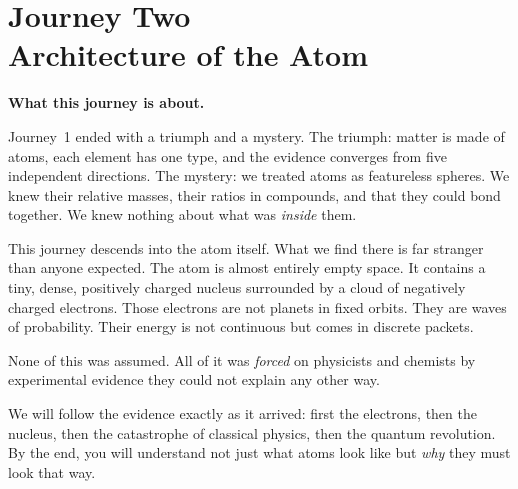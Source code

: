 \documentclass[12pt, a4paper]{book}
\theoremstyle{definition}
\begin{document}
\setcounter{chapter}{1}   %

\chapter[Journey 2 --- Architecture of the Atom]
        {Journey Two\\[8pt]
         \textcolor{ModuleColor}{\large Architecture of the Atom}}
\label{ch:journey2}

\begin{tcolorbox}[
  enhanced, colback=JourneyColor!8, colframe=JourneyColor,
  arc=4pt, left=6mm, right=6mm, top=4mm, bottom=4mm
]
\sffamily\small
\textbf{What this journey is about.}

Journey~1 ended with a triumph and a mystery.
The triumph: matter is made of atoms, each element has one type,
and the evidence converges from five independent directions.
The mystery: we treated atoms as featureless spheres.
We knew their relative masses, their ratios in compounds,
and that they could bond together.
We knew nothing about what was \emph{inside} them.

This journey descends into the atom itself.
What we find there is far stranger than anyone expected.
The atom is almost entirely empty space.
It contains a tiny, dense, positively charged nucleus
surrounded by a cloud of negatively charged electrons.
Those electrons are not planets in fixed orbits.
They are waves of probability.
Their energy is not continuous but comes in discrete packets.

None of this was assumed.
All of it was \emph{forced} on physicists and chemists
by experimental evidence they could not explain any other way.

We will follow the evidence exactly as it arrived:
first the electrons, then the nucleus, then the catastrophe
of classical physics, then the quantum revolution.
By the end, you will understand not just what atoms look like
but \emph{why} they must look that way.
\end{tcolorbox}

\vspace{1em}
\end{document}
